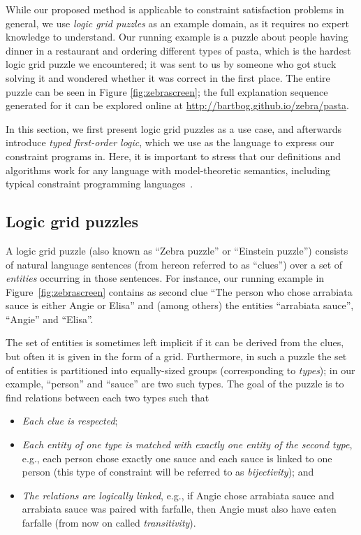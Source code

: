 While our proposed method is applicable to constraint satisfaction problems in general, we use \emph{logic grid puzzles} as an example domain, as it requires no expert knowledge to understand.
Our running example is a puzzle about people having dinner in a restaurant and ordering different types of pasta, which is the hardest logic grid puzzle we encountered; it was sent to us by someone who got stuck solving it and wondered whether it was correct in the first place.    
The entire puzzle can be seen in Figure \ref{fig:zebrascreen}; the full explanation sequence generated for it can be explored online at \url{http://bartbog.github.io/zebra/pasta}.

In this section, we first present logic grid puzzles as a use case, and afterwards introduce \emph{typed first-order logic}, which we use as the language to express our constraint programs in. Here, it is important to stress that our definitions and algorithms work for any language with model-theoretic semantics, including typical constraint programming languages~\cite{rossi2006handbook}.


\subsection{Logic grid puzzles}
A logic grid puzzle (also known as ``Zebra puzzle'' or ``Einstein puzzle'') consists of natural language sentences (from hereon referred to as ``clues'') over a set of \emph{entities} occurring in those sentences. 
For instance, our running example in Figure~\ref{fig:zebrascreen} contains as second clue ``The person who chose arrabiata sauce is either Angie or Elisa'' and (among others) the entities ``arrabiata sauce'', ``Angie'' and ``Elisa''. 

The set of entities is sometimes left implicit if it can be derived from the clues, but often it is given in the form of a grid. 
Furthermore, in such a puzzle the set of entities is partitioned into equally-sized groups (corresponding to \emph{types}); in our example, ``person'' and ``sauce'' are two such types. 
% 
The goal of the puzzle is to find relations between each two types such that
\begin{itemize}
	\item \emph{Each clue is respected}; 
	\item \emph{Each entity of one type is matched with exactly one entity of the second type}, e.g., each person chose exactly one sauce and each sauce is linked to one person (this type of constraint will be referred to as \emph{bijectivity}); and 
	\item \emph{The relations are logically linked}, e.g., if Angie chose arrabiata sauce and arrabiata sauce was paired with farfalle, then Angie must also have eaten farfalle (from now on called \emph{transitivity}). 
\end{itemize}





